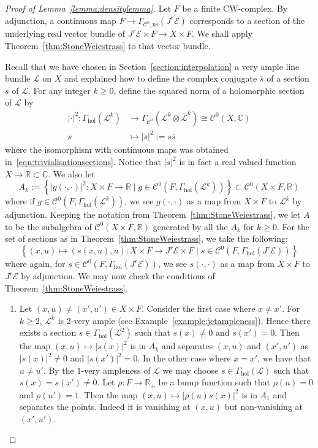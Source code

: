 \documentclass[a4paper]{amsart}
\newcommand{\bR}{\mathbb R}
\newcommand{\bC}{\mathbb C}
\newcommand{\cE}{\mathcal E}
\newcommand{\cC}{\mathcal C}
\newcommand{\cL}{\mathcal L}
\newcommand{\lra}{\longrightarrow}
\theoremstyle{plain}
\theoremstyle{definition}
\newcommand{\Gammahol}{\Gamma_{\mathrm{hol}}}
\begin{document}
\begin{proof}[Proof of Lemma~\ref{lemma:densitylemma}]
Let $F$ be a finite CW-complex. By adjunction, a continuous map $F \to \Gamma_{\cC^0, \mathrm{ns}}\left(J^r\cE\right)$ corresponds to a section of the underlying real vector bundle of $J^r\cE \times F \to X \times F$. We shall apply Theorem~\ref{thm:StoneWeiestrass} to that vector bundle. 

Recall that we have chosen in Section~\ref{section:interpolation} a very ample line bundle $\cL$ on $X$ and explained how to define the complex conjugate $\overline{s}$ of a section $s$ of $\cL$. For any integer $k \geq 0$, define the squared norm of a holomorphic section of $\cL$ by
\begin{align*}
    |\cdot|^2 \colon \Gammahol(\cL^k) &\lra \Gamma_{\cC^0}(\cL^k \otimes \overline{\cL}^k) \cong \cC^0(X,\bC) \\
    s &\longmapsto |s|^2 := s\overline{s}
\end{align*}
where the isomorphism with continuous maps was obtained in~\eqref{eqn:trivialisationsections}. Notice that $|s|^2$ is in fact a real valued function $X \to \bR \subset \bC$. We also let
\[
    A_k := \left\{ |g(\cdot,\cdot)|^2 \colon X \times F \to \bR \mid g \in \cC^0(F, \Gammahol(\cL^k)) \right\} \subset \cC^0(X\times F, \bR)
\]
where if $g \in \cC^0(F, \Gammahol(\cL^k))$, we see $g(\cdot,\cdot)$ as a map from  $X \times F$ to $\cL^k$ by adjunction. Keeping the notation from Theorem~\ref{thm:StoneWeiestrass}, we let $A$ to be the subalgebra of $\cC^0(X \times F, \bR)$ generated by all the $A_k$ for $k \geq 0$. For the set of sections as in Theorem~\ref{thm:StoneWeiestrass}, we take the following:
\begin{equation}\label{eqn:setofsectionsproofdensitylemma}
    \left\{ (x,u) \mapsto (s(x,u), u) \colon X \times F \to J^r\cE \times F \mid s \in \cC^0(F, \Gammahol(J^r\cE)) \right\}
\end{equation}
where again, for $s \in \cC^0(F, \Gammahol(J^r\cE))$, we see $s(\cdot,\cdot)$ as a map from $X \times F$ to $J^r\cE$ by adjunction.
We may now check the conditions of Theorem~\ref{thm:StoneWeiestrass}.
\begin{enumerate}
    \item Let $(x,u) \neq (x',u') \in X \times F$. Consider the first case where $x \neq x'$. For $k\geq 2$, $\cL^k$ is 2-very ample (see Example~\ref{example:jetampleness}). Hence there exists a section $s \in \Gammahol(\cL^2)$ such that $s(x) \neq 0$ and $s(x') = 0$. Then the map $(x,u) \mapsto |s(x)|^2$ is in $A_k$ and separates $(x,u)$ and $(x',u')$ as $|s(x)|^2 \neq 0$ and $|s(x')|^2 = 0$. In the other case where $x = x'$, we have that $u \neq u'$. By the $1$-very ampleness of $\cL$ we may choose $s \in \Gammahol(\cL)$ such that $s(x) = s(x') \neq 0$. Let $\rho : F \to \bR_+$ be a bump function such that $\rho(u) = 0$ and $\rho(u') = 1$. Then the map $(x,u) \mapsto |\rho(u)s(x)|^2$ is in $A_1$ and separates the points. Indeed it is vanishing at $(x,u)$ but non-vanishing at $(x',u')$.

\end{enumerate}
\end{proof}
\end{document}
